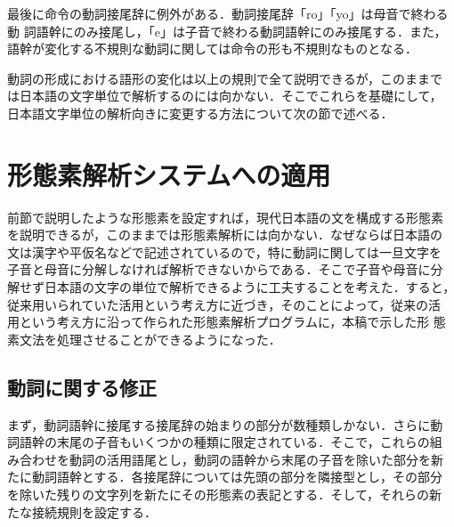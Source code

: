 最後に命令の動詞接尾辞に例外がある．動詞接尾辞「ro」「yo」は母音で終わる動
詞語幹にのみ接尾し，「e」は子音で終わる動詞語幹にのみ接尾する．また，
語幹が変化する不規則な動詞に関しては命令の形も不規則なものとなる．

動詞の形成における語形の変化は以上の規則で全て説明できるが，このままで
は日本語の文字単位で解析するのには向かない．そこでこれらを基礎にして，
日本語文字単位の解析向きに変更する方法について次の節で述べる．

\section{形態素解析システムへの適用} \label{apply}
前節で説明したような形態素を設定すれば，現代日本語の文を構成する形態素
を説明できるが，このままでは形態素解析には向かない．なぜならば日本語の
文は漢字や平仮名などで記述されているので，特に動詞に関しては一旦文字を
子音と母音に分解しなければ解析できないからである．そこで子音や母音に分
解せず日本語の文字の単位で解析できるように工夫することを考えた．すると，
従来用いられていた活用という考え方に近づき，そのことによって，従来の活
用という考え方に沿って作られた形態素解析プログラムに，本稿で示した形
態素文法を処理させることができるようになった．

\subsection{動詞に関する修正}
まず，動詞語幹に接尾する接尾辞の始まりの部分が数種類しかない．さらに動
詞語幹の末尾の子音もいくつかの種類に限定されている．そこで，これらの組
み合わせを動詞の活用語尾とし，動詞の語幹から末尾の子音を除いた部分を新
たに動詞語幹とする．各接尾辞については先頭の部分を隣接型とし，その部分
を除いた残りの文字列を新たにその形態素の表記とする．そして，それらの新
たな接続規則を設定する．

